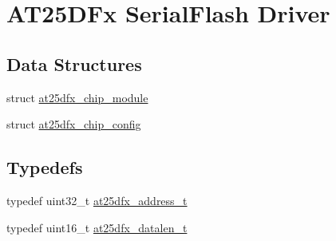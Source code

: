 \hypertarget{group__asfdoc__common2__at25dfx__group}{}\section{A\+T25\+D\+Fx Serial\+Flash Driver}
\label{group__asfdoc__common2__at25dfx__group}
\subsection*{Data Structures}
\begin{DoxyCompactItemize}
\item 
struct \mbox{\hyperlink{structat25dfx__chip__module}{at25dfx\+\_\+chip\+\_\+module}}
\item 
struct \mbox{\hyperlink{structat25dfx__chip__config}{at25dfx\+\_\+chip\+\_\+config}}
\end{DoxyCompactItemize}
\subsection*{Typedefs}
\begin{DoxyCompactItemize}
\item 
typedef uint32\+\_\+t \mbox{\hyperlink{group__asfdoc__common2__at25dfx__group_ga6797a814b041014cef23de480c9da9ef}{at25dfx\+\_\+address\+\_\+t}}
\item 
typedef uint16\+\_\+t \mbox{\hyperlink{group__asfdoc__common2__at25dfx__group_gaebf176d512c4cc61390aef7159ddccb9}{at25dfx\+\_\+datalen\+\_\+t}}
\end{DoxyCompactItemize}
